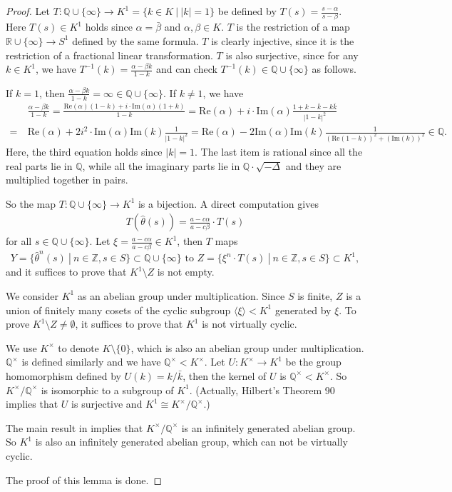 \documentclass{amsart}
\numberwithin{equation}{section}
\theoremstyle{definition}
\begin{document}
\begin{proof}
Let $T:\mathbb{Q}\cup \{\infty\}\to K^1=\{k\in K\ |\ |k|=1\}$ be defined by $T(s)=\frac{s-\alpha}{s-\beta}$. Here $T(s)\in K^1$ holds since $\alpha=\bar{\beta}$ and $\alpha,\beta\in K$. $T$ is the restriction of a map $\mathbb{R}\cup \{\infty\}\to S^1$ defined by the same formula. $T$ is clearly injective, since it is the restriction of a fractional linear transformation. $T$ is also surjective, since for any $k\in K^1$, we have $T^{-1}(k)=\frac{\alpha-\beta k}{1-k}$ and can check $T^{-1}(k)\in \mathbb{Q}\cup \{\infty\}$ as follows.

If $k=1$, then  $\frac{\alpha-\beta k}{1-k}=\infty \in \mathbb{Q}\cup \{\infty\}$. If $k\ne 1$, we have 
\begin{align*}
& \frac{\alpha-\beta k}{1-k}=\frac{\text{Re}(\alpha)(1-k)+i\cdot \text{Im}(\alpha)(1+k)}{1-k}=\text{Re}(\alpha)+i\cdot \text{Im}(\alpha)\frac{1+k-\bar{k}-k\bar{k}}{|1-k|^2}\\
=\ & \text{Re}(\alpha)+2i^2\cdot \text{Im}(\alpha)\text{Im}(k)\frac{1}{|1-k|^2}=\text{Re}(\alpha)-2\text{Im}(\alpha)\text{Im}(k)\frac{1}{(\text{Re}(1-k))^2+(\text{Im}(k))^2}\in \mathbb{Q}.
\end{align*}
Here, the third equation holds since $|k|=1$. The last item is rational since all the real parts lie in $\mathbb{Q}$, while all the imaginary parts lie in $\mathbb{Q}\cdot \sqrt{-\Delta}$ and they are multiplied together in pairs.

So the map $T:\mathbb{Q}\cup \{\infty\}\to K^1$ is a bijection. A direct computation gives
\begin{align*}
T(\hat{\theta}(s))=\frac{a-c\alpha}{a-c\beta}\cdot T(s)
\end{align*}
for all $s\in \mathbb{Q}\cup \{\infty\}$. Let $\xi=\frac{a-c\alpha}{a-c\beta}\in K^1$, then $T$ maps 
$$Y=\{\hat{\theta}^n(s)\ |\ n\in \mathbb{Z},s\in S\}\subset \mathbb{Q}\cup \{\infty\}\text{\ to\ } Z=\{\xi^n \cdot T(s)\ |\ n\in \mathbb{Z},s\in S\}\subset K^1,$$ and it suffices to prove that $K^1\setminus Z$ is not empty.
 
We consider $K^1$ as an abelian group under multiplication.
 Since $S$ is finite, $Z$ is a union of finitely many cosets of the cyclic subgroup $\langle \xi \rangle<K^1$ generated by $\xi$. To prove $K^1\setminus Z\ne \emptyset$, it suffices to prove that $K^1$ is not virtually cyclic.
 
We use $K^{\times}$ to denote $K\setminus \{0\}$, which is also an abelian group under multiplication. $\mathbb{Q}^{\times}$ is defined similarly and we have $\mathbb{Q}^{\times} <K^{\times}$. Let $U:K^{\times}\to K^1$ be the group homomorphism defined by $U(k)=k/\bar{k}$, then the kernel of $U$ is $\mathbb{Q}^{\times}<K^{\times}$. So $K^{\times}/\mathbb{Q}^{\times}$ is isomorphic to a subgroup of $K^1$. (Actually, Hilbert's Theorem 90 implies that $U$ is surjective and $K^1\cong K^{\times}/\mathbb{Q}^{\times}$.)
 
The main result in \cite{Bra} implies that $K^{\times}/\mathbb{Q}^{\times}$ is an infinitely generated abelian group. So $K^1$ is also an infinitely generated abelian group, which can not be virtually cyclic.

The proof of this lemma is done.
 \end{proof}
\end{document}
